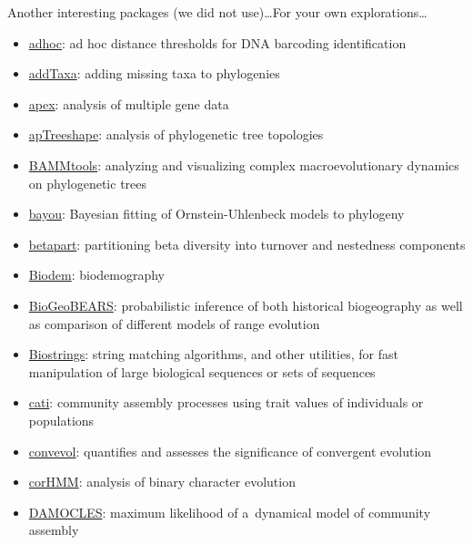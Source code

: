 \documentclass[compress, ucs, xelatex, 11pt, xcolor=svgnames,
	hyperref={
		bookmarks=true,
		unicode=true,
		colorlinks=true,
		pdftitle={Molecular data in R},
		plainpages=false,
		pdfauthor={Vojtech Zeisek},
		pdfsubject={Course about phylogeny and evolution in R},
		pdfcreator={XeLaTeX},
		pdfkeywords={R, evolution, phylogeny, molecular data},
		linkcolor=Tomato,
		anchorcolor=SaddleBrown,
		citecolor=Goldenrod,
		filecolor=DarkMagenta,
		menucolor=Sienna,
		urlcolor=DarkTurquoise,
		pdftex},
	url={hyphens, lowtilde} %
	]{beamer}
\begin{document}
\begin{frame}[allowframebreaks]{Another interesting packages (we did not use)\ldots}{For your own explorations\ldots}
	\begin{itemize}
		\item \href{https://CRAN.R-project.org/package=adhoc}{adhoc}: ad hoc distance thresholds for DNA barcoding identification
		\item \href{https://github.com/eliotmiller/addTaxa}{addTaxa}: adding missing taxa to phylogenies
		\item \href{https://CRAN.R-project.org/package=apex}{apex}: analysis of multiple gene data
		\item \href{https://CRAN.R-project.org/package=apTreeshape}{apTreeshape}: analysis of phylogenetic tree topologies
		\item \href{https://CRAN.R-project.org/package=BAMMtools}{BAMMtools}: analyzing and visualizing complex macroevolutionary dynamics on phylogenetic trees
		\item \href{https://CRAN.R-project.org/package=bayou}{bayou}: Bayesian fitting of Ornstein-Uhlenbeck models to phylogeny
		\item \href{https://CRAN.R-project.org/package=betapart}{betapart}: partitioning beta diversity into turnover and nestedness components
		\item \href{https://CRAN.R-project.org/package=Biodem}{Biodem}: biodemography
		\item \href{https://CRAN.R-project.org/package=BioGeoBEARS}{BioGeoBEARS}: probabilistic inference of both historical biogeography as well as comparison of different models of range evolution
		\item \href{https://www.bioconductor.org/packages/release/bioc/html/Biostrings.html}{Biostrings}: string matching algorithms, and other utilities, for fast manipulation of large biological sequences or sets of sequences
		\item \href{https://CRAN.R-project.org/package=cati}{cati}: community assembly processes using trait values of individuals or populations
		\item \href{https://CRAN.R-project.org/package=convevol}{convevol}: quantifies and assesses the significance of convergent evolution
		\item \href{https://CRAN.R-project.org/package=corHMM}{corHMM}: analysis of binary character evolution
		\item \href{https://CRAN.R-project.org/package=DAMOCLES}{DAMOCLES}: maximum likelihood of a~dynamical model of community assembly

\end{itemize}
\end{frame}
\end{document}
